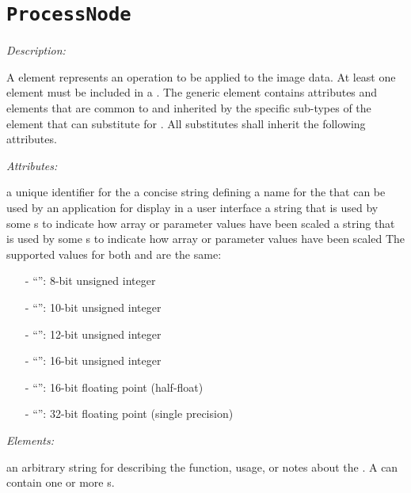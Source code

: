 \section{\texttt{ProcessNode}}
\label{sec:ProcessNode}

\emph{Description:} \par
A  element represents an operation to be applied to the image data. At least one  element must be included in a . The generic  element contains attributes and elements that are common to and inherited by the specific sub-types of the  element that can substitute for . All  substitutes shall inherit the following attributes.

\emph{Attributes:}
\label{sec:process-node-attr}
\begin{xmlfields}
    \xmlitem[id][optional]  a unique identifier for the 
    \xmlitem[name][optional] a concise string defining a name for the  that can be used by an application for display in a user interface
    \xmlitem[inBitDepth][required] a string that is used by some s to indicate how array or parameter values have been scaled
    \xmlitem[outBitDepth][required] a string that is used by some s to indicate how array or parameter values have been scaled
    The supported values for both  and  are the same:
        \begin{itemize}
            \item[-] ``'': 8-bit unsigned integer
            \item[-] ``'': 10-bit unsigned integer
            \item[-] ``'': 12-bit unsigned integer
            \item[-] ``'': 16-bit unsigned integer
            \item[-] ``'': 16-bit floating point (half-float)
            \item[-] ``'': 32-bit floating point (single precision)
        \end{itemize}
\end{xmlfields}

\emph{Elements:}
\label{sec:process-node-elements}
\begin{xmlfields}
    \xmlitem[Description][optional] an arbitrary string for describing the function, usage, or notes about the . A  can contain one or more s.
\end{xmlfields}